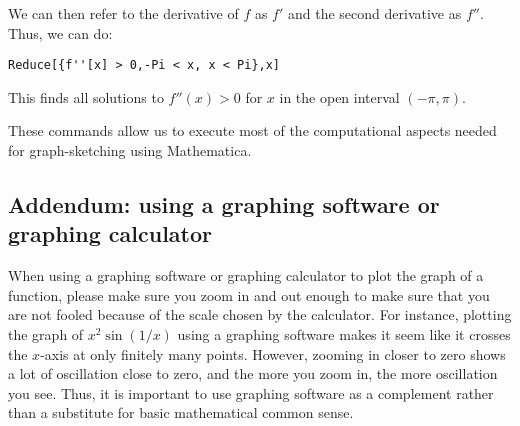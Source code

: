 \documentclass[10pt]{amsart}
\begin{document}
We can then refer to the derivative of $f$ as $f'$ and the second
derivative as $f''$. Thus, we can do:

\begin{verbatim}
Reduce[{f''[x] > 0,-Pi < x, x < Pi},x]
\end{verbatim}

This finds all solutions to $f''(x) > 0$ for $x$ in the open interval
$(-\pi,\pi)$.

These commands allow us to execute most of the computational aspects
needed for graph-sketching using Mathematica.

\subsection*{Addendum: using a graphing software or graphing calculator}

When using a graphing software or graphing calculator to plot the
graph of a function, please make sure you zoom in and out enough to
make sure that you are not fooled because of the scale chosen by the
calculator. For instance, plotting the graph of $x^2 \sin(1/x)$ using
a graphing software makes it seem like it crosses the $x$-axis at only
finitely many points. However, zooming in closer to zero shows a lot
of oscillation close to zero, and the more you zoom in, the more
oscillation you see. Thus, it is important to use graphing software as
a complement rather than a substitute for basic mathematical common
sense.
\end{document}
